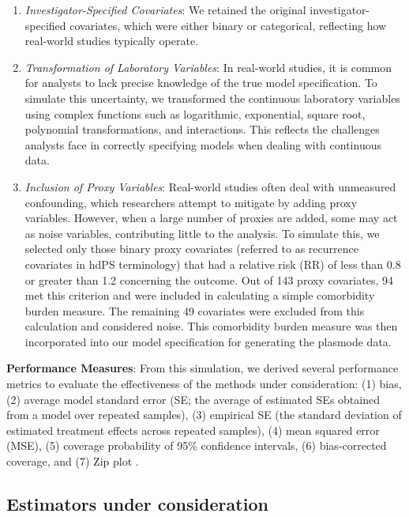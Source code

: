 \documentclass[sn-vancouver,Numbered,lineno,pdflatex]{sn-jnl}
\begin{document}
\begin{enumerate}
\def\labelenumi{\arabic{enumi}.}
\item
  \emph{Investigator-Specified Covariates}: We retained the original
  investigator-specified covariates, which were either binary or
  categorical, reflecting how real-world studies typically operate.
\item
  \emph{Transformation of Laboratory Variables}: In real-world studies,
  it is common for analysts to lack precise knowledge of the true model
  specification. To simulate this uncertainty, we transformed the
  continuous laboratory variables using complex functions such as
  logarithmic, exponential, square root, polynomial transformations, and
  interactions. This reflects the challenges analysts face in correctly
  specifying models when dealing with continuous data.
\item
  \emph{Inclusion of Proxy Variables}: Real-world studies often deal
  with unmeasured confounding, which researchers attempt to mitigate by
  adding proxy variables. However, when a large number of proxies are
  added, some may act as noise variables, contributing little to the
  analysis. To simulate this, we selected only those binary proxy
  covariates (referred to as recurrence covariates in hdPS terminology)
  that had a relative risk (RR) of less than 0.8 or greater than 1.2
  concerning the outcome. Out of 143 proxy covariates, 94 met this
  criterion and were included in calculating a simple comorbidity burden
  measure. The remaining 49 covariates were excluded from this
  calculation and considered noise. This comorbidity burden measure was
  then incorporated into our model specification for generating the
  plasmode data.
\end{enumerate}

\textbf{Performance Measures}: From this simulation, we derived several
performance metrics to evaluate the effectiveness of the methods under
consideration: (1) bias, (2) average model standard error (SE; the
average of estimated SEs obtained from a model over repeated samples),
(3) empirical SE (the standard deviation of estimated treatment effects
across repeated samples), (4) mean squared error (MSE), (5) coverage
probability of 95\% confidence intervals, (6) bias-corrected coverage,
and (7) Zip plot \citep{morris2019using, white2023check}.

\subsection*{Estimators under
consideration}\label{estimators-under-consideration}
\end{document}
